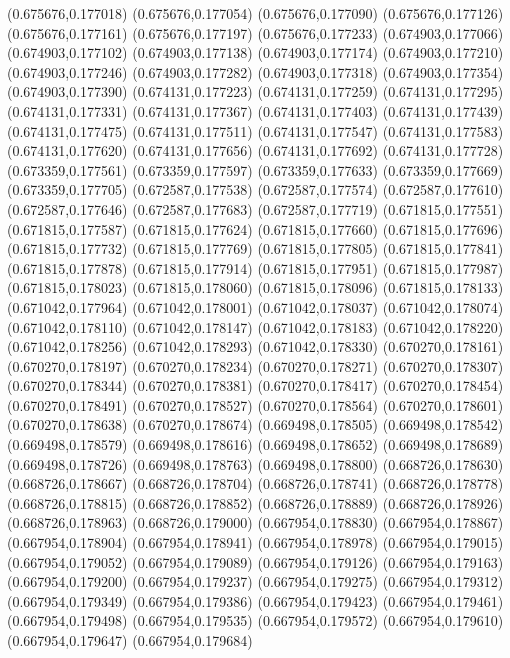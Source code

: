 (0.675676,0.177018)
(0.675676,0.177054)
(0.675676,0.177090)
(0.675676,0.177126)
(0.675676,0.177161)
(0.675676,0.177197)
(0.675676,0.177233)
(0.674903,0.177066)
(0.674903,0.177102)
(0.674903,0.177138)
(0.674903,0.177174)
(0.674903,0.177210)
(0.674903,0.177246)
(0.674903,0.177282)
(0.674903,0.177318)
(0.674903,0.177354)
(0.674903,0.177390)
(0.674131,0.177223)
(0.674131,0.177259)
(0.674131,0.177295)
(0.674131,0.177331)
(0.674131,0.177367)
(0.674131,0.177403)
(0.674131,0.177439)
(0.674131,0.177475)
(0.674131,0.177511)
(0.674131,0.177547)
(0.674131,0.177583)
(0.674131,0.177620)
(0.674131,0.177656)
(0.674131,0.177692)
(0.674131,0.177728)
(0.673359,0.177561)
(0.673359,0.177597)
(0.673359,0.177633)
(0.673359,0.177669)
(0.673359,0.177705)
(0.672587,0.177538)
(0.672587,0.177574)
(0.672587,0.177610)
(0.672587,0.177646)
(0.672587,0.177683)
(0.672587,0.177719)
(0.671815,0.177551)
(0.671815,0.177587)
(0.671815,0.177624)
(0.671815,0.177660)
(0.671815,0.177696)
(0.671815,0.177732)
(0.671815,0.177769)
(0.671815,0.177805)
(0.671815,0.177841)
(0.671815,0.177878)
(0.671815,0.177914)
(0.671815,0.177951)
(0.671815,0.177987)
(0.671815,0.178023)
(0.671815,0.178060)
(0.671815,0.178096)
(0.671815,0.178133)
(0.671042,0.177964)
(0.671042,0.178001)
(0.671042,0.178037)
(0.671042,0.178074)
(0.671042,0.178110)
(0.671042,0.178147)
(0.671042,0.178183)
(0.671042,0.178220)
(0.671042,0.178256)
(0.671042,0.178293)
(0.671042,0.178330)
(0.670270,0.178161)
(0.670270,0.178197)
(0.670270,0.178234)
(0.670270,0.178271)
(0.670270,0.178307)
(0.670270,0.178344)
(0.670270,0.178381)
(0.670270,0.178417)
(0.670270,0.178454)
(0.670270,0.178491)
(0.670270,0.178527)
(0.670270,0.178564)
(0.670270,0.178601)
(0.670270,0.178638)
(0.670270,0.178674)
(0.669498,0.178505)
(0.669498,0.178542)
(0.669498,0.178579)
(0.669498,0.178616)
(0.669498,0.178652)
(0.669498,0.178689)
(0.669498,0.178726)
(0.669498,0.178763)
(0.669498,0.178800)
(0.668726,0.178630)
(0.668726,0.178667)
(0.668726,0.178704)
(0.668726,0.178741)
(0.668726,0.178778)
(0.668726,0.178815)
(0.668726,0.178852)
(0.668726,0.178889)
(0.668726,0.178926)
(0.668726,0.178963)
(0.668726,0.179000)
(0.667954,0.178830)
(0.667954,0.178867)
(0.667954,0.178904)
(0.667954,0.178941)
(0.667954,0.178978)
(0.667954,0.179015)
(0.667954,0.179052)
(0.667954,0.179089)
(0.667954,0.179126)
(0.667954,0.179163)
(0.667954,0.179200)
(0.667954,0.179237)
(0.667954,0.179275)
(0.667954,0.179312)
(0.667954,0.179349)
(0.667954,0.179386)
(0.667954,0.179423)
(0.667954,0.179461)
(0.667954,0.179498)
(0.667954,0.179535)
(0.667954,0.179572)
(0.667954,0.179610)
(0.667954,0.179647)
(0.667954,0.179684)
